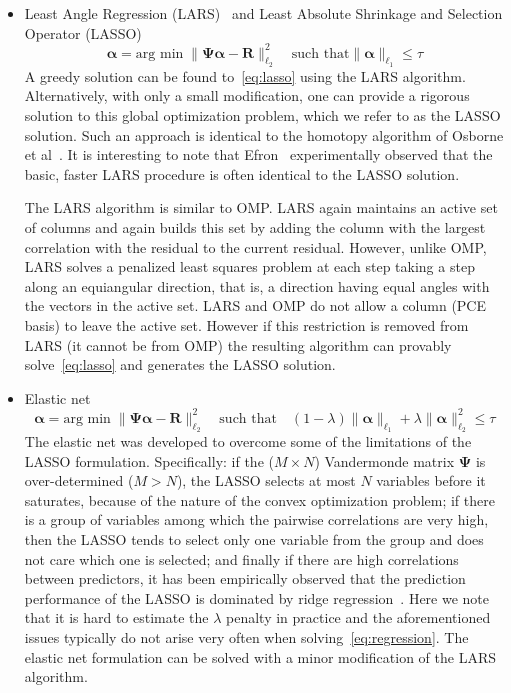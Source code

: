 \begin{itemize}
\item Least Angle Regression (LARS)~\cite{Efron2004} and Least Absolute Shrinkage and Selection Operator (LASSO)~\cite{Tibshirani1996}
\begin{equation}
\label{eq:lasso}
 \boldsymbol{\alpha} = \text{arg min}\; \|\boldsymbol{\Psi}\boldsymbol{\alpha} - \boldsymbol{R}\|_{\ell_2}^2 \quad \text{such that}\|\boldsymbol{\alpha}\|_{\ell_1} \le \tau
\end{equation}
A greedy solution can be found to~\eqref{eq:lasso} using the LARS algorithm.
Alternatively, with only a small modification, one can provide a rigorous solution to this global optimization problem, which we refer to as the LASSO solution. Such an approach is identical to the homotopy algorithm of
Osborne et al~\cite{Osborne2000}. It is interesting to note that 
Efron~\cite{Efron2004} experimentally observed that the basic, faster LARS 
procedure is often identical to the LASSO solution.

The LARS algorithm is similar to OMP. LARS again maintains an active set of columns and again builds
this set by adding the column with the largest correlation with the residual to the current residual.
However, unlike OMP, LARS solves a penalized least squares problem at each step taking a step along an equiangular direction, that is, a direction
having equal angles with the vectors in the active set. LARS and OMP do not allow a column (PCE basis)
to leave the active set. However if this restriction is removed from LARS (it cannot be from OMP)
the resulting algorithm can provably solve~\eqref{eq:lasso} and generates the LASSO solution.

\item Elastic net~\cite{Zou2005}
\begin{equation}
\label{eq:elastic-net}
 \boldsymbol{\alpha} = \text{arg min}\; \|\boldsymbol{\Psi}\boldsymbol{\alpha} - \boldsymbol{R}\|_{\ell_2}^2 \quad \text{such that}\quad (1-\lambda)\|\boldsymbol{\alpha}\|_{\ell_1} + 
\lambda\|\boldsymbol{\alpha}\|_{\ell_2}^2 \le \tau
\end{equation}
The elastic net was developed to overcome some of the limitations of the LASSO formulation. 
Specifically: if the ($M\times N$) Vandermonde matrix $\boldsymbol{\Psi}$ is over-determined ($M>N$), 
the LASSO selects at most $N$ variables before it saturates, because of the
nature of the convex optimization problem; if there is a group of variables among which the pairwise correlations are very high, then
the LASSO tends to select only one variable from the group and does not care which one is
selected; and finally if there are high correlations between predictors, it has been
empirically observed that the prediction performance of the LASSO is dominated by ridge
regression~\cite{Tibshirani1996}. Here we note that it is hard to estimate the $\lambda$ 
penalty in practice and the aforementioned issues typically do not arise very often when 
solving~\eqref{eq:regression}. The elastic net formulation can be solved with a minor modification of
the LARS algorithm.
\end{itemize}

